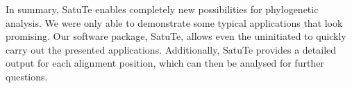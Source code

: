 \medskip

In summary, SatuTe enables completely new possibilities for phylogenetic analysis. We were only able to demonstrate some typical applications that look promising. Our software package, SatuTe, allows even the uninitiated to quickly carry out the presented applications. Additionally, SatuTe provides a detailed output for each alignment position, which can then be analysed for further questions.


\bigskip



\backmatter
 




